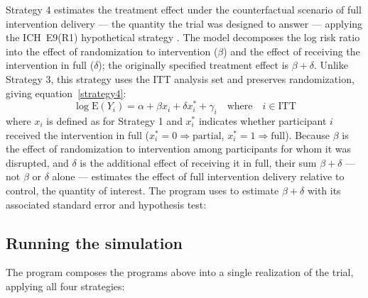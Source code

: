 Strategy 4 estimates the treatment effect under the counterfactual
scenario of full intervention delivery --- the quantity the trial was
designed to answer --- applying the ICH~E9(R1) hypothetical strategy
\citep{iche9r1}. The model decomposes the log risk ratio into the effect
of randomization to intervention ($\beta$) and the effect of receiving
the intervention in full ($\delta$); the originally specified treatment
effect is $\beta+\delta$. Unlike Strategy 3, this strategy uses the ITT
analysis set and preserves randomization, giving equation~\eqref{strategy4}:
%
\begin{equation}\label{strategy4}
  \log \mathrm{E}(Y_i) = \alpha + \beta x_i + \delta x_i^\ast + \gamma_i \quad \mathrm{where}\quad i \in \mathrm{ITT}
\end{equation}
%
where $x_i$ is defined as for Strategy 1 and $x_i^\ast$ indicates whether
participant $i$ received the intervention in full
($x_i^\ast\!=\!0\!\Rightarrow\!\mathrm{partial}$,
$x_i^\ast\!=\!1\!\Rightarrow\!\mathrm{full}$). Because $\beta$ is the
effect of randomization to intervention among participants for whom it
was disrupted, and $\delta$ is the additional effect of receiving it in
full, their sum $\beta+\delta$ --- not $\beta$ or $\delta$ alone ---
estimates the effect of full intervention delivery relative to control,
the quantity of interest. The program  uses
 to estimate $\beta+\delta$ with its associated standard
error and hypothesis test:

\begin{minipage}{\linewidth}
\begin{stlog}
\nullskip
\end{stlog}
\end{minipage}

\subsection{Running the simulation}

The program  composes the programs above into a
single realization of the trial, applying all four strategies:

\begin{minipage}{\linewidth}
\begin{stlog}
\nullskip
\end{stlog}
\end{minipage}

